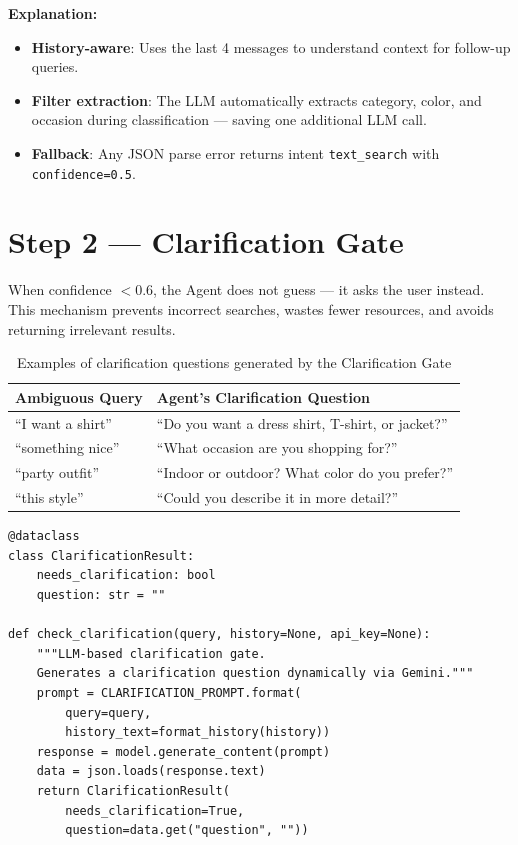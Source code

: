 \documentclass[12pt, twoside]{report}
\begin{document}
\textbf{Explanation:}
\begin{itemize}
    \item \textbf{History-aware}: Uses the last 4 messages to understand context for follow-up queries.
    \item \textbf{Filter extraction}: The LLM automatically extracts category, color, and occasion during classification --- saving one additional LLM call.
    \item \textbf{Fallback}: Any JSON parse error returns intent \texttt{text\_search} with \texttt{confidence=0.5}.
\end{itemize}

\section{Step 2 --- Clarification Gate}

\begin{tcolorbox}[title=Method: Proactive Clarification]
When confidence $< 0.6$, the Agent does not guess --- it asks the user instead. This mechanism prevents incorrect searches, wastes fewer resources, and avoids returning irrelevant results.
\end{tcolorbox}

\begin{table}[H]
\centering
\begin{tabular}{ll}
\toprule
\textbf{Ambiguous Query} & \textbf{Agent's Clarification Question}\\
\midrule
``I want a shirt''        & ``Do you want a dress shirt, T-shirt, or jacket?''\\
``something nice''        & ``What occasion are you shopping for?''\\
``party outfit''          & ``Indoor or outdoor? What color do you prefer?''\\
``this style''            & ``Could you describe it in more detail?''\\
\bottomrule
\end{tabular}
\caption{Examples of clarification questions generated by the Clarification Gate}
\end{table}

\begin{lstlisting}[caption={Clarification Gate --- agent/clarification\_gate.py}]
@dataclass
class ClarificationResult:
    needs_clarification: bool
    question: str = ""

def check_clarification(query, history=None, api_key=None):
    """LLM-based clarification gate.
    Generates a clarification question dynamically via Gemini."""
    prompt = CLARIFICATION_PROMPT.format(
        query=query,
        history_text=format_history(history))
    response = model.generate_content(prompt)
    data = json.loads(response.text)
    return ClarificationResult(
        needs_clarification=True,
        question=data.get("question", ""))
\end{lstlisting}
\end{document}
